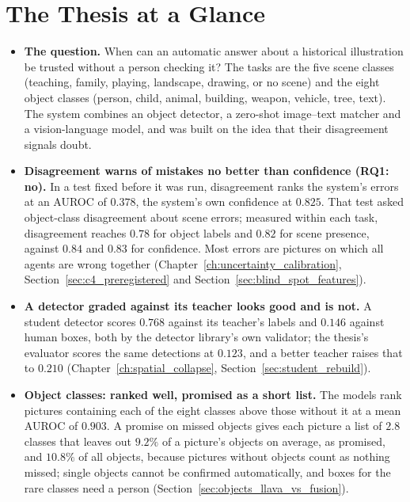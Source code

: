 \documentclass[12pt,a4paper]{report}
\begin{document}
\section*{The Thesis at a Glance}
\begin{itemize}
    \item \textbf{The question.} When can an automatic answer about a historical illustration be trusted without a person checking it? The tasks are the five scene classes (teaching, family, playing, landscape, drawing, or no scene) and the eight object classes (person, child, animal, building, weapon, vehicle, tree, text). The system combines an object detector, a zero-shot image--text matcher and a vision-language model, and was built on the idea that their disagreement signals doubt.
    \item \textbf{Disagreement warns of mistakes no better than confidence (RQ1: no).} In a test fixed before it was run, disagreement ranks the system's errors at an AUROC of $0.378$, the system's own confidence at $0.825$. That test asked object-class disagreement about scene errors; measured within each task, disagreement reaches $0.78$ for object labels and $0.82$ for scene presence, against $0.84$ and $0.83$ for confidence. Most errors are pictures on which all agents are wrong together (Chapter~\ref{ch:uncertainty_calibration}, Section~\ref{sec:c4_preregistered} and Section~\ref{sec:blind_spot_features}).
    \item \textbf{A detector graded against its teacher looks good and is not.} A student detector scores $0.768$ against its teacher's labels and $0.146$ against human boxes, both by the detector library's own validator; the thesis's evaluator scores the same detections at $0.123$, and a better teacher raises that to $0.210$ (Chapter~\ref{ch:spatial_collapse}, Section~\ref{sec:student_rebuild}).
    \item \textbf{Object classes: ranked well, promised as a short list.} The models rank pictures containing each of the eight classes above those without it at a mean AUROC of $0.903$. A promise on missed objects gives each picture a list of $2.8$ classes that leaves out $9.2\%$ of a picture's objects on average, as promised, and $10.8\%$ of all objects, because pictures without objects count as nothing missed; single objects cannot be confirmed automatically, and boxes for the rare classes need a person (Section~\ref{sec:objects_llava_vs_fusion}).

\end{itemize}
\end{document}
